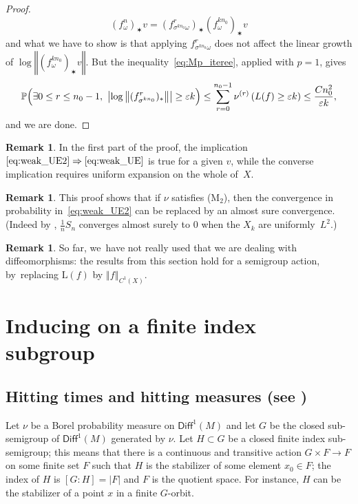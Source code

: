 \documentclass[11pt]{article}
\let\e\varepsilon
\newcommand{\norm}[1]{{\left\Vert#1\right\Vert}}
\newcommand{\abs}[1]{\left\vert#1\right\vert}
\newcommand{\lrpar}[1]{\left(#1\right)}
\newcommand{\Blrpar}[1]{\Bigl(#1\Bigr)}
\newcommand\Diff{{\mathsf{Diff}}}
\theoremstyle{plain}
\theoremstyle{definition}
\newtheorem{rem}[thm]{Remark}
\numberwithin{equation}{section}
\begin{document}
\begin{proof}
\begin{equation*}\label{eq:differential}
{(f^{n }_\omega)_\varstar v} = (f^{r}_{\sigma^{kn_0} \omega})_\varstar
(f^{kn_0}_\omega)_\varstar v
\end{equation*}
and what we have to show is that applying $f^{r}_{\sigma^{kn_0} \omega}$
does not affect
the linear growth of $ \log\norm{ (f^{kn_0}_\omega)_\varstar v }$.
But the inequality~\eqref{eq:Mp_iteree}, applied with $p=1$, gives
\begin{equation*}
\P \Blrpar{\exists 0\leq r\leq n_0-1, \ \abs{\log\norm{ ( f^{r}_{\sigma^{kn_0}})_\varstar }}\geq \e k}
\leq \sum_{r=0}^{n_0-1}
\nu^{(r)}\lrpar{ L(f) \geq \e k}
\leq \frac{Cn_0^2}{\e k} ,
\end{equation*}
and we are done.
\end{proof}

\begin{rem} \label{rem:given_v} In the first part of the proof,
the implication~$\eqref{eq:weak_UE2}\Rightarrow\eqref{eq:weak_UE}$ is true for a given $v$, while the converse implication requires uniform expansion on the whole of~$X$.
\end{rem}

\begin{rem}
This proof shows that if $\nu$ satisfies (M$_2$), then the convergence in probability in~\eqref{eq:weak_UE2} can be replaced by an almost sure convergence. (Indeed by \cite[Th.\,3, p.\,243]{Feller:vol2},
$\frac{1}{n}S_n$ converges almost surely to $0$ when the $X_k$ are uniformly~$L^2$.)
\end{rem}

\begin{rem}
So far, we~have not really used that we are dealing with diffeomorphisms: the results from this section
hold for a semigroup action, by~replacing $\mathrm L(f)$ by $\norm{f}_{C^1(X)}$.
\end{rem}

\section{Inducing on a finite index subgroup} \label{sec:inducing}

\subsection{Hitting times and hitting measures (see \cite[Chap.\,5]{benoist-quint_book}) }\label{par:hitting_measure}

Let $\nu$ be a Borel
probability measure on $\Diff^1(M)$ and let $G$ be the
closed sub-semigroup of $\Diff^1(M)$ generated by $\nu$.
Let $H\subset G$ be a closed finite index
sub-semigroup; this means that
there is a continuous and transitive action $G\times F \to F$ on some finite set $F$ such that $H$ is the stabilizer of some element $x_0\in F$; the index of
$H$ is $[G:H]=\abs{F}$ and $F$ is the quotient space.
For instance, $H$ can be the stabilizer of a point $x$ in a finite $G$-orbit.
\end{document}
